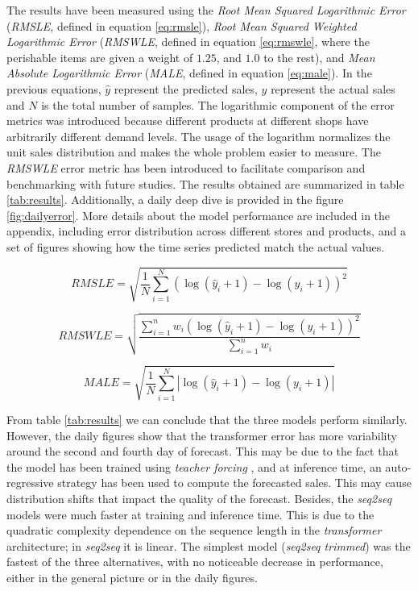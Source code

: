 \documentclass{elsarticle}
\begin{document}
	The results have been measured using the \textit{Root Mean Squared Logarithmic Error} (\textit{RMSLE}, defined in equation \ref{eq:rmsle}), \textit{Root Mean Squared Weighted Logarithmic Error} (\textit{RMSWLE}, defined in equation \ref{eq:rmswle}, where the perishable items are given a weight of $1.25$, and $1.0$ to the rest),  and \textit{Mean Absolute Logarithmic Error} (\textit{MALE}, defined in equation \ref{eq:male}). In the previous equations, $\hat{y}$ represent the predicted sales,  $y$ represent the actual sales and $N$ is the total number of samples. The logarithmic component of the error metrics was introduced because different products at different shops have arbitrarily different demand levels. The usage of the logarithm normalizes the unit sales distribution and makes the whole problem easier to measure. The \textit{RMSWLE} error metric has been introduced to facilitate comparison and benchmarking with future studies. The results obtained are summarized in table \ref{tab:results}. Additionally, a daily deep dive is provided in the figure \ref{fig:dailyerror}. More details about the model performance are included in the appendix, including error distribution across different stores and products, and a set of figures showing how the time series predicted match the actual values.
	
	\begin{equation} \label{eq:rmsle}	
	RMSLE = \sqrt{ \frac{1}{N} \displaystyle\sum_{i=1}^N  \left(\log(\hat{y}_i + 1) - \log(y_i +1)  \right)^2  }
	\end{equation}
	
	\begin{equation} \label{eq:rmswle}	
	RMSWLE = \sqrt{ \frac{\displaystyle\sum_{i=1}^n w_i \left( \log(\hat{y}_i + 1) - \log(y_i +1)  \right)^2  }{\displaystyle\sum_{i=1}^n w_i}}
	\end{equation}
	
	\begin{equation} \label{eq:male}	
	MALE = \sqrt{ \frac{1}{N} \displaystyle\sum_{i=1}^N  \left|\log(\hat{y}_i + 1) - \log(y_i +1)  \right|  }
	\end{equation}
	
	From table \ref{tab:results} we can conclude that the three models perform similarly. However, the daily figures show that the transformer error has more variability around the second and fourth day of forecast. This may be due to the fact that the model has been trained using \textit{teacher forcing} \cite{williams1989, goyal2016}, and at inference time, an auto-regressive strategy has been used to compute the forecasted sales. This may cause distribution shifts that impact the quality of the forecast.  Besides, the \textit{seq2seq} models were much faster at training and inference time. This is due to the quadratic complexity dependence on the sequence length in the \textit{transformer} architecture; in \textit{seq2seq} it is linear. The simplest model (\textit{seq2seq trimmed}) was the fastest of the three alternatives, with no noticeable decrease in performance, either in the general picture or in the daily figures.
\end{document}
